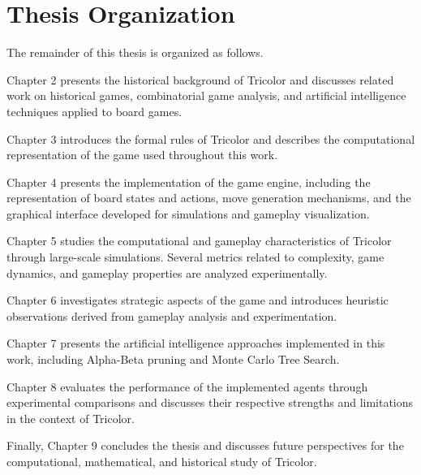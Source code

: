 \section{Thesis Organization}

The remainder of this thesis is organized as follows.

Chapter 2 presents the historical background of Tricolor and discusses related work on historical games, combinatorial game analysis, and artificial intelligence techniques applied to board games.

Chapter 3 introduces the formal rules of Tricolor and describes the computational representation of the game used throughout this work.

Chapter 4 presents the implementation of the game engine, including the representation of board states and actions, move generation mechanisms, and the graphical interface developed for simulations and gameplay visualization.

Chapter 5 studies the computational and gameplay characteristics of Tricolor through large-scale simulations. Several metrics related to complexity, game dynamics, and gameplay properties are analyzed experimentally.

Chapter 6 investigates strategic aspects of the game and introduces heuristic observations derived from gameplay analysis and experimentation.

Chapter 7 presents the artificial intelligence approaches implemented in this work, including Alpha-Beta pruning and Monte Carlo Tree Search.

Chapter 8 evaluates the performance of the implemented agents through experimental comparisons and discusses their respective strengths and limitations in the context of Tricolor.

Finally, Chapter 9 concludes the thesis and discusses future perspectives for the computational, mathematical, and historical study of Tricolor.